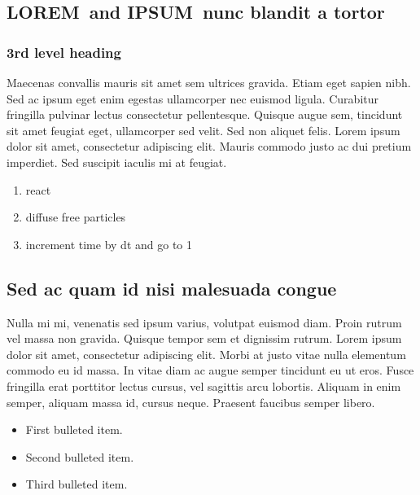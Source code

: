 \documentclass[
  10pt,
  letterpaper,
]{article}
\begin{document}
\subsection{\texorpdfstring{\textbf{LOREM}~and \textbf{IPSUM}~nunc
blandit a
tortor}{LOREM~and IPSUM~nunc blandit a tortor}}\label{lorem-and-ipsum-nunc-blandit-a-tortor}

\subsubsection{3rd level heading}\label{rd-level-heading}

Maecenas convallis mauris sit amet sem ultrices gravida. Etiam eget
sapien nibh. Sed ac ipsum eget enim egestas ullamcorper nec euismod
ligula. Curabitur fringilla pulvinar lectus consectetur pellentesque.
Quisque augue sem, tincidunt sit amet feugiat eget, ullamcorper sed
velit. Sed non aliquet felis. Lorem ipsum dolor sit amet, consectetur
adipiscing elit. Mauris commodo justo ac dui pretium imperdiet. Sed
suscipit iaculis mi at feugiat.

\begin{enumerate}
\def\labelenumi{\arabic{enumi}.}
\item
  react
\item
  diffuse free particles
\item
  increment time by dt and go to 1
\end{enumerate}

\subsection{Sed ac quam id nisi malesuada
congue}\label{sed-ac-quam-id-nisi-malesuada-congue}

Nulla mi mi, venenatis sed ipsum varius, volutpat euismod diam. Proin
rutrum vel massa non gravida. Quisque tempor sem et dignissim rutrum.
Lorem ipsum dolor sit amet, consectetur adipiscing elit. Morbi at justo
vitae nulla elementum commodo eu id massa. In vitae diam ac augue semper
tincidunt eu ut eros. Fusce fringilla erat porttitor lectus cursus, vel
sagittis arcu lobortis. Aliquam in enim semper, aliquam massa id, cursus
neque. Praesent faucibus semper libero.

\begin{itemize}
\item
  First bulleted item.
\item
  Second bulleted item.
\item
  Third bulleted item.
\end{itemize}
\end{document}

